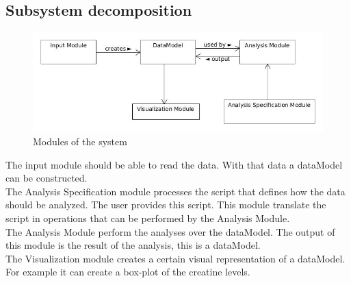 \documentclass[a4paper]{article}
\begin{document}
\subsection{Subsystem decomposition}

\begin{figure}[h]
	\centering
    	\includegraphics[scale=0.5]{images/modules.jpg}
    \caption{Modules of the system}
	\label{fig:modules}
\end{figure}

The input module should be able to read the data. With that data a dataModel
can be constructed. \\
The Analysis Specification module processes the script that defines how the
data should be analyzed. The user provides this script. This module translate
the script in operations that can be performed by the Analysis Module.\\
The Analysis Module perform the analyses over the dataModel. The output of this
module is the result of the analysis, this is a dataModel.\\
The Visualization module creates a certain visual representation of a
dataModel. For example it can create a box-plot of the creatine levels.
\end{document}
